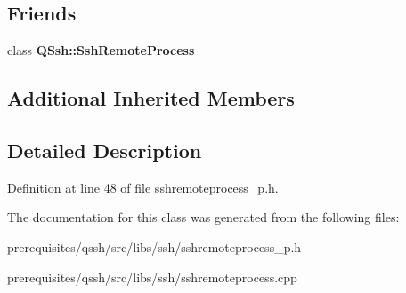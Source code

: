 \subsection*{Friends}
\begin{DoxyCompactItemize}
\item 
\mbox{\label{class_q_ssh_1_1_internal_1_1_ssh_remote_process_private_a9f228fd916394eabd4cdfa2c5aefb87a}} 
class {\bfseries Q\+Ssh\+::\+Ssh\+Remote\+Process}
\end{DoxyCompactItemize}
\subsection*{Additional Inherited Members}


\subsection{Detailed Description}


Definition at line 48 of file sshremoteprocess\+\_\+p.\+h.



The documentation for this class was generated from the following files\+:\begin{DoxyCompactItemize}
\item 
prerequisites/qssh/src/libs/ssh/sshremoteprocess\+\_\+p.\+h\item 
prerequisites/qssh/src/libs/ssh/sshremoteprocess.\+cpp\end{DoxyCompactItemize}
